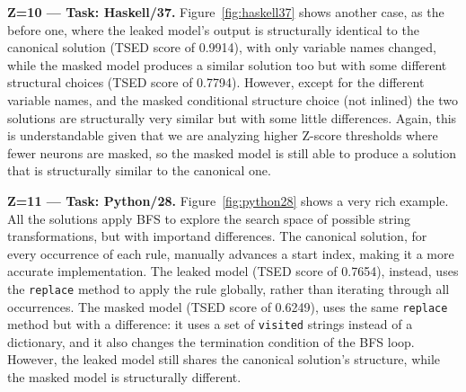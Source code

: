 \documentclass[mscthesis]{usiinfthesis}
\begin{document}
\textbf{Z=10 --- Task: Haskell/37. }
Figure~\ref{fig:haskell37} shows another case, as the before one, where the leaked model's output is structurally identical to the canonical solution (TSED score of 0.9914),
with only variable names changed, while the masked model produces a similar solution too but with some different structural choices (TSED score of 0.7794).
However, except for the different variable names, and the masked conditional structure choice (not inlined) the two solutions are structurally very similar but with some little differences.
Again, this is understandable given that we are analyzing higher Z-score thresholds where fewer neurons are masked, so the masked model is still able to produce a solution that is structurally similar to the canonical one.
\par\vspace{1em}
\textbf{Z=11 --- Task: Python/28. }
Figure~\ref{fig:python28} shows a very rich example.
All the solutions apply BFS to explore the search space of possible string transformations, but with importand differences.
The canonical solution, for every occurrence of each rule, manually advances a start index, making it a more accurate implementation.
The leaked model (TSED score of 0.7654), instead, uses the \texttt{replace} method to apply the rule globally, rather than iterating through all occurrences.
The masked model (TSED score of 0.6249), uses the same \texttt{replace} method but with a difference: it uses a set of \texttt{visited} strings instead of a dictionary, and it also changes the termination condition of the BFS loop.
However, the leaked model still shares the canonical solution's structure, while the masked model is structurally different.
\newpage
\end{document}

